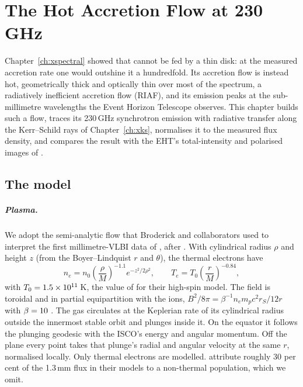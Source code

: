 \chapter{The Hot Accretion Flow at 230\,GHz}
\label{ch:xriaf}

Chapter~\ref{ch:xspectral} showed that \sgra{} cannot be fed by a thin disk:
at the measured accretion rate one would outshine it a hundredfold. Its
accretion flow is instead hot, geometrically thick and optically thin over
most of the spectrum, a radiatively inefficient accretion flow (RIAF), and
its emission peaks at the sub-millimetre wavelengths the Event Horizon
Telescope observes. This chapter builds such a flow, traces its 230\,GHz
synchrotron emission with radiative transfer along the Kerr--Schild rays of
Chapter~\ref{ch:xks}, normalises it to the measured flux density, and
compares the result with the EHT's total-intensity \citep{EHT2022} and
polarised \citep{EHT2024pol, EHT2024polint} images of \sgra.

\section{The model}

\paragraph{Plasma.} We adopt the semi-analytic flow that Broderick and
collaborators used to interpret the first millimetre-VLBI data of \sgra{}
\citep{BroderickLoeb2006, Broderick2011}, after \citet{Yuan2003}. With
cylindrical radius $\rho$ and height $z$ (from the Boyer--Lindquist $r$ and
$\theta$), the thermal electrons have
\begin{equation}
n_e = n_0 \left(\frac{\rho}{M}\right)^{-1.1} e^{-z^2/2\rho^2}, \qquad
T_e = T_0 \left(\frac{r}{M}\right)^{-0.84},
\label{eq:riaf}
\end{equation}
with $T_0 = 1.5\times10^{11}$\,K, the value of \citet{BroderickLoeb2006} for their
high-spin model. The field is toroidal and in partial equipartition with the
ions, $B^2/8\pi = \beta^{-1} n_e m_p c^2 r_S/12r$ with $\beta = 10$
\citep{Broderick2011}. The gas circulates at the Keplerian rate of its
cylindrical radius outside the innermost stable orbit and plunges inside it.
On the equator it follows the plunging geodesic with the ISCO's energy and
angular momentum. Off the plane every point takes that plunge's radial and
angular velocity at the same $r$, normalised locally. Only thermal electrons
are modelled. \citet{Broderick2011} attribute roughly 30 per cent of the
1.3\,mm flux in their models to a non-thermal population, which we omit.

